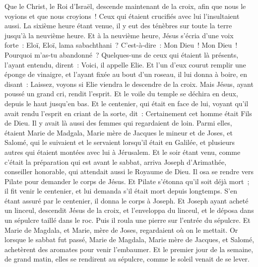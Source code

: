 \begin{multicols}{2}
Que le Christ, le Roi d'Israël, descende maintenant de la croix, afin que nous le voyions et que nous croyions~! Ceux qui étaient crucifiés avec lui l'insultaient aussi.
La sixième heure étant venue, il y eut des ténèbres sur toute la terre jusqu'à la neuvième heure.
Et à la neuvième heure, Jésus s'écria d'une voix forte~: Eloï, Eloï, lama sabachthani~? C'est-à-dire~: Mon Dieu~! Mon Dieu~! Pourquoi m'as-tu abandonné~?
Quelques-uns de ceux qui étaient là présents, l'ayant entendu, dirent~: Voici, il appelle Elie.
Et l'un d'eux courut remplir une éponge de vinaigre, et l'ayant fixée au bout d'un roseau, il lui donna à boire, en disant~: Laissez, voyons si Elie viendra le descendre de la croix.
Mais Jésus, ayant poussé un grand cri, rendit l'esprit.
Et le voile du temple se déchira en deux, depuis le haut jusqu'en bas.
Et le centenier, qui était en face de lui, voyant qu'il avait rendu l'esprit en criant de la sorte, dit~: Certainement cet homme était Fils de Dieu.
Il y avait là aussi des femmes qui regardaient de loin. Parmi elles, étaient Marie de Madgala, Marie mère de Jacques le mineur et de Joses, et Salomé,
qui le suivaient et le servaient lorsqu'il était en Galilée, et plusieurs autres qui étaient montées avec lui à Jérusalem.
Et le soir étant venu, comme c'était la préparation qui est avant le sabbat,
arriva Joseph d'Arimathée, conseiller honorable, qui attendait aussi le Royaume de Dieu. Il osa se rendre vers Pilate pour demander le corps de Jésus.
Et Pilate s'étonna qu'il soit déjà mort~; il fit venir le centenier, et lui demanda s'il était mort depuis longtemps.
S'en étant assuré par le centenier, il donna le corps à Joseph.
Et Joseph ayant acheté un linceul, descendit Jésus de la croix, et l'enveloppa du linceul, et le déposa dans un sépulcre taillé dans le roc. Puis il roula une pierre sur l'entrée du sépulcre.
Et Marie de Magdala, et Marie, mère de Joses, regardaient où on le mettait.
\VerseOne{}Or lorsque le sabbat fut passé, Marie de Magdala, Marie mère de Jacques, et Salomé, achetèrent des aromates pour venir l'embaumer.
Et le premier jour de la semaine, de grand matin, elles se rendirent au sépulcre, comme le soleil venait de se lever.

\end{multicols}
